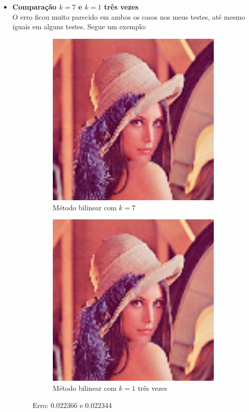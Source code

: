\documentclass[leqno]{article}
\begin{document}
\begin{itemize}
    \item \textbf{Comparação $k = 7$ e $k = 1$ três vezes} \\
        O erro ficou muito parecido em ambos os casos nos meus testes, até mesmo
        iguais em alguns testes. Segue um exemplo:

      \begin{figure}[H]
          \centering
          \begin{subfigure}{.45\textwidth}
            \centering
            \includegraphics[width=.7\linewidth]{../images/lena_k7x1.png}
            \caption{Método bilinear com $k = 7$}
            \label{fig:sub2}
          \end{subfigure}
          \begin{subfigure}{.45\textwidth}
              \centering
              \includegraphics[width=.7\linewidth]{../images/lena_k1x3.png}
              \caption{Método bilinear com $k = 1$ três vezes}
              \label{fig:sub1}
            \end{subfigure}%
          \caption{Erro: 0.022366 e 0.022344}
          \label{fig:test}
      \end{figure}
\end{itemize}
\end{document}
